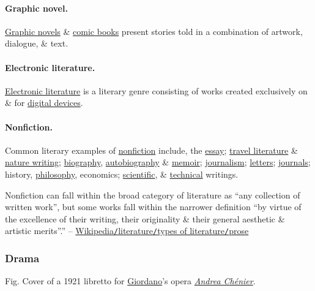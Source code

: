 \documentclass[oneside]{book}
\numberwithin{equation}{section}
\begin{document}
\paragraph{Graphic novel.} \href{https://en.wikipedia.org/wiki/Graphic_novel}{Graphic novels} \& \href{https://en.wikipedia.org/wiki/Comic_book}{comic books} present stories told in a combination of artwork, dialogue, \& text.

\paragraph{Electronic literature.} \href{https://en.wikipedia.org/wiki/Electronic_literature}{Electronic literature} is a literary genre consisting of works created exclusively on \& for \href{https://en.wikipedia.org/wiki/Digital_devices}{digital devices}.

\paragraph{Nonfiction.} Common literary examples of \href{https://en.wikipedia.org/wiki/Nonfiction}{nonfiction} include, the \href{https://en.wikipedia.org/wiki/Essay}{essay}; \href{https://en.wikipedia.org/wiki/Travel_literature}{travel literature} \& \href{https://en.wikipedia.org/wiki/Nature_writing}{nature writing}; \href{https://en.wikipedia.org/wiki/Biography}{biography}, \href{https://en.wikipedia.org/wiki/Autobiography}{autobiography} \& \href{https://en.wikipedia.org/wiki/Memoir}{memoir}; \href{https://en.wikipedia.org/wiki/Journalism}{journalism}; \href{https://en.wikipedia.org/wiki/Letter_(message)}{letters}; \href{https://en.wikipedia.org/wiki/Diary}{journals}; history, \href{https://en.wikipedia.org/wiki/Philosophy_and_literature#Philosophical_writing_as_literature}{philosophy}, economics; \href{https://en.wikipedia.org/wiki/Scientific_writing}{scientific}, \& \href{https://en.wikipedia.org/wiki/Technical_writing}{technical} writings.

Nonfiction can fall within the broad category of literature as ``any collection of written work'', but some works fall within the narrower definition ``by virtue of the excellence of their writing, their originality \& their general aesthetic \& artistic merits''.'' -- \href{https://en.wikipedia.org/wiki/Literature#Prose}{Wikipedia\texttt{/}literature\texttt{/}types of literature\texttt{/}prose}

\subsubsection{Drama}
\textsf{Fig. Cover of a 1921 libretto for \href{https://en.wikipedia.org/wiki/Umberto_Giordano}{Giordano}'s opera \href{https://en.wikipedia.org/wiki/Andrea_Chenier}{\textit{Andrea Ch\'enier}}.}
\end{document}
